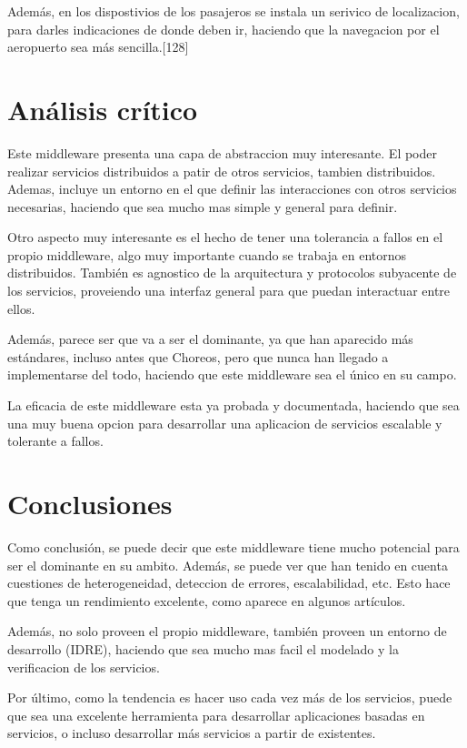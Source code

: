 \documentclass[runningheads]{llncs}
\begin{document}
Además, en los dispostivios de los pasajeros se instala un serivico de localizacion, para darles indicaciones de donde deben ir, haciendo que la navegacion por el aeropuerto sea más sencilla.[128]

\section{Análisis crítico}
Este middleware presenta una capa de abstraccion muy interesante. El poder realizar servicios distribuidos a patir de otros servicios, tambien distribuidos. Ademas, incluye un entorno en el que definir las interacciones con otros servicios necesarias, haciendo que sea mucho mas simple y general para definir.

Otro aspecto muy interesante es el hecho de tener una tolerancia a fallos en el propio middleware, algo muy importante cuando se trabaja en entornos distribuidos. También es agnostico de la arquitectura y protocolos subyacente de los servicios, proveiendo una interfaz general para que puedan interactuar entre ellos.

Además, parece ser que va a ser el dominante, ya que han aparecido más estándares, incluso antes que Choreos, pero que nunca han llegado a implementarse del todo, haciendo que este middleware sea el único en su campo.

La eficacia de este middleware esta ya probada y documentada, haciendo que sea una muy buena opcion para desarrollar una aplicacion de servicios escalable y tolerante a fallos.

\section{Conclusiones}
Como conclusión, se puede decir que este middleware tiene mucho potencial para ser el dominante en su ambito. Además, se puede ver que han tenido en cuenta cuestiones de heterogeneidad, deteccion de errores, escalabilidad, etc. Esto hace que tenga un rendimiento excelente, como aparece en algunos artículos.

Además, no solo proveen el propio middleware, también proveen un entorno de desarrollo (IDRE), haciendo que sea mucho mas facil el modelado y la verificacion de los servicios.

Por último, como la tendencia es hacer uso cada vez más de los servicios, puede que sea una excelente herramienta para desarrollar aplicaciones basadas en servicios, o incluso desarrollar más servicios a partir de existentes.
\end{document}
